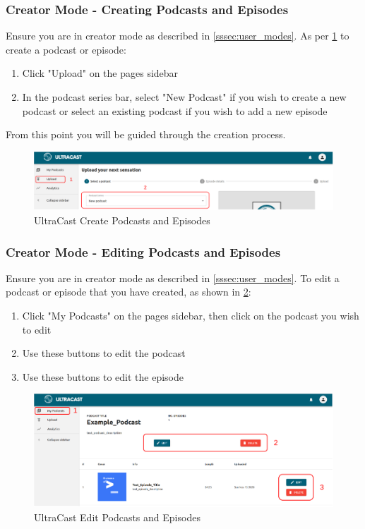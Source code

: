 \documentclass[../report.tex]{subfiles}
\begin{document}
\subsubsection{Creator Mode - Creating Podcasts and Episodes}
Ensure you are in creator mode as described in \cref{sssec:user_modes}. As per \cref{fig:UM_create} to create
a podcast or episode:
\begin{enumerate}
    \item Click "Upload" on the pages sidebar
    \item In the podcast series bar, select "New Podcast" if you wish to create a new podcast or select an existing podcast if you wish to add a new episode
\end{enumerate}
%
From this point you will be guided through the creation process.
\begin{figure}[ht]
    \centering
    \includegraphics[width=16cm]{resources/UM_Create}
    \caption{UltraCast Create Podcasts and Episodes}
    \label{fig:UM_create} 
\end{figure}

\subsubsection{Creator Mode - Editing Podcasts and Episodes}

Ensure you are in creator mode as described in \cref{sssec:user_modes}. 
To edit a podcast or episode that you have created, as shown in \cref{fig:UM_edit}:
\begin{enumerate}
    \item Click "My Podcasts" on the pages sidebar, then click on the podcast you wish to edit
    \item Use these buttons to edit the podcast
    \item Use these buttons to edit the episode
\end{enumerate}
\begin{figure}[ht]
    \centering
    \includegraphics[width=16cm]{resources/UM_Edit}
    \caption{UltraCast Edit Podcasts and Episodes}
    \label{fig:UM_edit} 
\end{figure}
\end{document}
